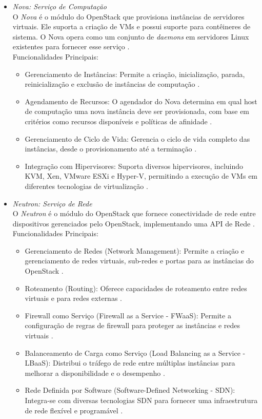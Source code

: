 \begin{itemize}
\begin{itemize}
    \item \emph{Nova: Serviço de Computação}\\
    O \textit{Nova} é o módulo do OpenStack que provisiona instâncias de servidores virtuais. Ele suporta a criação de VMs e possui suporte para contêineres de sistema. O Nova opera como um conjunto de \textit{daemons} em servidores Linux existentes para fornecer esse serviço \cite{openstack_nova}.\\
    Funcionalidades Principais:
    \begin{itemize}
        \item Gerenciamento de Instâncias: Permite a criação, inicialização, parada, reinicialização e exclusão de instâncias de computação \cite{openstack_nova}.
        \item Agendamento de Recursos: O agendador do Nova determina em qual host de computação uma nova instância deve ser provisionada, com base em critérios como recursos disponíveis e políticas de afinidade \cite{openstack_nova}.
        \item Gerenciamento de Ciclo de Vida: Gerencia o ciclo de vida completo das instâncias, desde o provisionamento até a terminação \cite{openstack_nova}.
        \item Integração com Hipervisores: Suporta diversos hipervisores, incluindo KVM, Xen, VMware ESXi e Hyper-V, permitindo a execução de VMs em diferentes tecnologias de virtualização \cite{openstack_nova}.
    \end{itemize}

    \item \emph{Neutron: Serviço de Rede}\\
    O \textit{Neutron} é o módulo do OpenStack que fornece conectividade de rede entre dispositivos gerenciados pelo OpenStack, implementando uma API de Rede \cite{openstack_neutron}.\\
    Funcionalidades Principais:
    \begin{itemize}
        \item Gerenciamento de Redes (Network Management): Permite a criação e gerenciamento de redes virtuais, sub-redes e portas para as instâncias do OpenStack \cite{openstack_neutron}.
        \item Roteamento (Routing): Oferece capacidades de roteamento entre redes virtuais e para redes externas \cite{openstack_neutron}.
        \item Firewall como Serviço (Firewall as a Service - FWaaS): Permite a configuração de regras de firewall para proteger as instâncias e redes virtuais \cite{openstack_neutron}.
        \item Balanceamento de Carga como Serviço (Load Balancing as a Service - LBaaS): Distribui o tráfego de rede entre múltiplas instâncias para melhorar a disponibilidade e o desempenho \cite{openstack_neutron}.
        \item Rede Definida por Software (Software-Defined Networking - SDN): Integra-se com diversas tecnologias SDN para fornecer uma infraestrutura de rede flexível e programável \cite{openstack_neutron}.
    \end{itemize}


\end{itemize}
\end{itemize}
